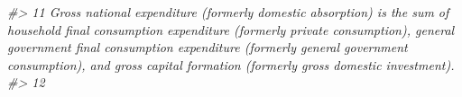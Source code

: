 \documentclass[
  xelatex, ja=standard]{bxjsbook}
\newenvironment{Shaded}{\begin{snugshade}}{\end{snugshade}}
\newcommand{\CommentTok}[1]{\textcolor[rgb]{0.56,0.35,0.01}{\textit{#1}}}
\theoremstyle{definition}
\theoremstyle{definition}
\theoremstyle{definition}
\theoremstyle{definition}
\theoremstyle{remark}
\begin{document}
\begin{Shaded}
\begin{Highlighting}[]
\CommentTok{\#\textgreater{} 11                                                                                                                                                                                                                                                                                                                                                                                                                                                                                                                                                                                                                                                                                                                                                                                                                                                                                                                                                                                                                                                                                                                                     Gross national expenditure (formerly domestic absorption) is the sum of household final consumption expenditure (formerly private consumption), general government final consumption expenditure (formerly general government consumption), and gross capital formation (formerly gross domestic investment).}
\CommentTok{\#\textgreater{} 12                                                                                                                                                                                                                                                                                                                                                                                                                                                                                                                                                                                                                                                                                                                                                                                                                                                                                                                                                                                                                                                                                                                                                                                                                                                                                                                                                                                                                                                  }

\end{Highlighting}
\end{Shaded}
\end{document}
